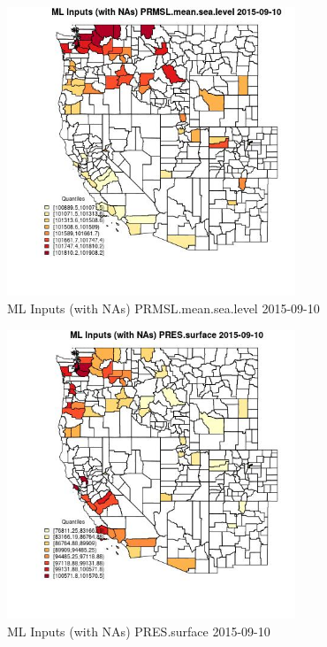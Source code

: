 \begin{figure} 
\centering  
\includegraphics[width=0.77\textwidth]{Code_Outputs/Report_ML_input_PM25_Step4_part_e_de_duplicated_aveswNAs_CountyPRMSLmeansealevelMean2015-09-10_2015-09-10.jpg} 
\caption{\label{fig:Report_ML_input_PM25_Step4_part_e_de_duplicated_aveswNAsCountyPRMSLmeansealevelMean2015-09-10_2015-09-10}ML Inputs (with NAs) PRMSL.mean.sea.level 2015-09-10} 
\end{figure} 
 

\begin{figure} 
\centering  
\includegraphics[width=0.77\textwidth]{Code_Outputs/Report_ML_input_PM25_Step4_part_e_de_duplicated_aveswNAs_CountyPRESsurfaceMean2015-09-10_2015-09-10.jpg} 
\caption{\label{fig:Report_ML_input_PM25_Step4_part_e_de_duplicated_aveswNAsCountyPRESsurfaceMean2015-09-10_2015-09-10}ML Inputs (with NAs) PRES.surface 2015-09-10} 
\end{figure} 
 

